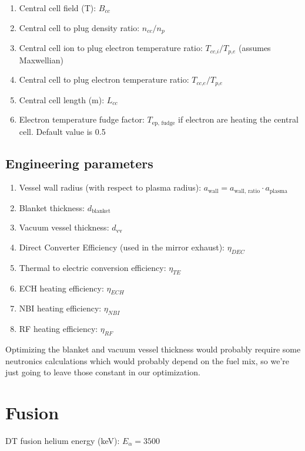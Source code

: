 \begin{enumerate}
    \item Central cell field (T): $B_{cc}$
    \item Central cell to plug density ratio: $n_{\textit{cc}}/n_p$
    \item Central cell ion to plug electron temperature ratio: $T_{\textit{cc,i}}/T_\textit{p,e}$ (assumes Maxwellian)
    \item Central cell to plug electron temperature ratio: $T_{\textit{cc,e}}/T_\textit{p,e}$
    \item Central cell length (m): $L_{cc}$
    \item Electron temperature fudge factor: $T_{\text{ep, fudge}}$ if electron are heating the central cell. Default value is 0.5
\end{enumerate}

\subsection{Engineering parameters}

\begin{enumerate}
    \item Vessel wall radius (with respect to plasma radius): $a_{\text{wall}} = a_\text{wall, ratio} \cdot a_\text{plasma}$
    \item Blanket thickness: $d_\text{blanket}$
    \item Vacuum vessel thickness: $d_\text{vv}$
    \item Direct Converter Efficiency (used in the mirror exhaust): $\eta_{DEC}$
    \item Thermal to electric conversion efficiency: $\eta_{TE}$
    \item ECH heating efficiency: $\eta_{ECH}$
    \item NBI heating efficiency: $\eta_{NBI}$
    \item RF heating efficiency: $\eta_{RF}$    
\end{enumerate}

Optimizing the blanket and vacuum vessel thickness would probably require some neutronics calculations which would probably depend on the fuel mix, so we're just going to leave those constant in our optimization.

\section{Fusion}
DT fusion helium energy (keV): $E_\alpha = 3500$

